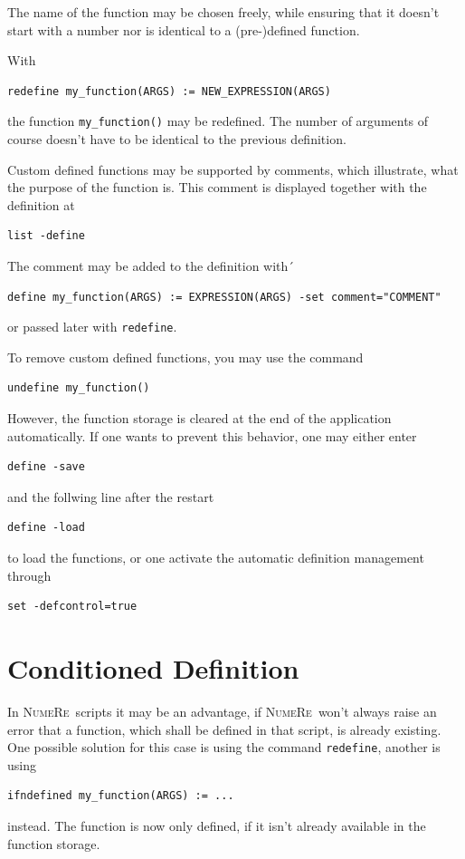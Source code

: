 \documentclass[DIV=14,headsepline,footsepline]{scrbook}
\newcommand{\NR}{\textsc{Nu\-me\-Re}}
\begin{document}
				The name of the function may be chosen freely, while ensuring that it doesn't start with a number nor is identical to a (pre-)defined function.
				
				With
				\begin{lstlisting}
redefine my_function(ARGS) := NEW_EXPRESSION(ARGS)
				\end{lstlisting}
				the function \verb+my_function()+ may be redefined. The number of arguments of course doesn't have to be identical to the previous definition.
				
				Custom defined functions may be supported by comments, which illustrate, what the purpose of the function is. This comment is displayed together with the definition at
				\begin{lstlisting}
list -define
				\end{lstlisting}
				
				The comment may be added to the definition with´
				\begin{lstlisting}
define my_function(ARGS) := EXPRESSION(ARGS) -set comment="COMMENT"
				\end{lstlisting}
				or passed later with \verb+redefine+.
				
				To remove custom defined functions, you may use the command
				\begin{lstlisting}
undefine my_function()
				\end{lstlisting}
				However, the function storage is cleared at the end of the application automatically. If one wants to prevent this behavior, one may either enter
				\begin{lstlisting}
define -save
				\end{lstlisting}
				and the follwing line after the restart
				\begin{lstlisting}
define -load
				\end{lstlisting}
				to load the functions, or one activate the automatic definition management through
				\begin{lstlisting}
set -defcontrol=true
				\end{lstlisting}
				
			\section{Conditioned Definition}
				In \NR\ scripts it may be an advantage, if \NR\ won't always raise an error that a function, which shall be defined in that script, is already existing. One possible solution for this case is using the command \verb+redefine+, another is using
				\begin{lstlisting}
ifndefined my_function(ARGS) := ...
				\end{lstlisting}
				instead. The function is now only defined, if it isn't already available in the function storage.
\end{document}
